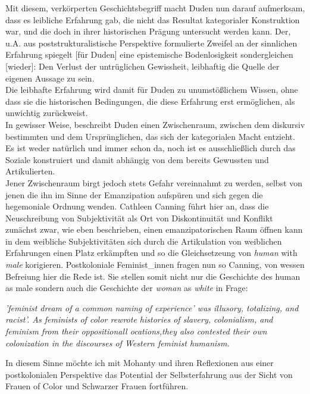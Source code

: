 \noindent Mit diesem, verkörperten Geschichtsbegriff macht Duden nun darauf aufmerksam,
dass es \glqq leibliche Erfahrung gab, die nicht das Resultat kategorialer
Konstruktion war, und die doch in ihrer historischen Prägung untersucht werden
kann.\grqq \footnotemark {} Der, u.A. aus poststrukturalistische Perspektive formulierte Zweifel
\glqq an der sinnlichen Erfahrung spiegelt [für Duden] eine epistemische
Bodenlosigkeit sondergleichen [wieder]: Den Verlust der untrüglichen
Gewissheit, leibhaftig die Quelle der eigenen Aussage zu sein. \grqq
\footnotemark {}\\
Die leibhafte
Erfahrung wird damit für Duden zu unumstößlichem Wissen, ohne dass sie die
historischen Bedingungen, die diese Erfahrung erst ermöglichen, als unwichtig
zurückweist. \\
In gewisser Weise, beschreibt Duden einen Zwischenraum, zwischen
dem diskursiv bestimmten und dem Ursprünglichen, das sich der kategorialen
Macht entzieht. Es ist weder natürlich und immer schon da, noch ist es
ausschließlich durch das Soziale konstruiert und damit abhängig von dem bereits
Gewussten und Artikulierten. \\

\noindent Jener Zwischenraum birgt jedoch stets Gefahr vereinnahmt zu werden, selbst von
jenen die ihn im Sinne der Emanzipation aufspüren und sich gegen die
hegemoniale Ordnung wenden. Cathleen Canning \footnotemark {} führt hier an, dass die
Neuschreibung von Subjektivität als Ort von Diskontinuität und Konflikt
zunächst zwar, wie eben beschrieben, einen emanzipatorischen Raum öffnen kann
in dem weibliche Subjektivitäten sich durch die Artikulation von weiblichen
Erfahrungen einen Platz erkämpften und so die Gleichsetzeung von \textit{human} with
\textit{male} korigieren. Postkoloniale Feminist\_innen fragen nun so Canning,
von wessen Befreiung hier die Rede ist. Sie stellen somit nicht nur die
Geschichte des human as male sondern auch die Geschichte der \textit{woman} as
\textit{white} in
Frage:
\begin{myenv}
 \textit{
 \glqq[...]'feminist dream of a common naming of experience' was illusory,
 totalizing, and racist'. As feminists of color rewrote histories of slavery,
 colonialism, and feminism from their oppositionall ocations,they also
 contested their own colonization in the discourses of Western feminist
 humanism. \grqq \footnotemark {} }
\end{myenv}
In diesem Sinne möchte ich mit Mohanty und ihren Reflexionen aus einer
postkolonialen Perspektive das Potential der Selbsterfahrung aus der Sicht von
Frauen of Color und Schwarzer Frauen fortführen.\\

